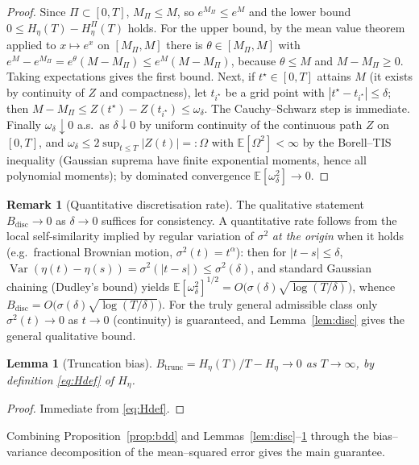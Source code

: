 \documentclass{amsart}
\newtheorem{lemma}{Lemma}
\theoremstyle{definition}
\newtheorem{remark}{Remark}
\DeclareMathOperator{\Var}{Var}
\newcommand{\E}{\mathbb{E}}
\begin{document}
\begin{proof}
Since $\Pi\subset[0,T]$, $M_\Pi\le M$, so $e^{M_\Pi}\le e^M$ and the lower bound
$0\le H_\eta(T)-H_\eta^\Pi(T)$ holds. For the upper bound, by the mean value
theorem applied to $x\mapsto e^x$ on $[M_\Pi,M]$ there is $\theta\in[M_\Pi,M]$
with $e^M-e^{M_\Pi}=e^{\theta}(M-M_\Pi)\le e^M(M-M_\Pi)$, because $\theta\le M$
and $M-M_\Pi\ge0$. Taking expectations gives the first bound. Next, if
$t^\star\in[0,T]$ attains $M$ (it exists by continuity of $Z$ and compactness),
let $t_{i^\star}$ be a grid point with $|t^\star-t_{i^\star}|\le\delta$; then
$M-M_\Pi\le Z(t^\star)-Z(t_{i^\star})\le\omega_\delta$. The Cauchy--Schwarz step
is immediate. Finally $\omega_\delta\downarrow0$ a.s.\ as $\delta\downarrow0$ by
uniform continuity of the continuous path $Z$ on $[0,T]$, and
$\omega_\delta\le 2\sup_{t\le T}|Z(t)|=:\Omega$ with $\E[\Omega^2]<\infty$ by the
Borell--TIS inequality (Gaussian suprema have finite exponential moments, hence
all polynomial moments); by dominated convergence $\E[\omega_\delta^2]\to0$.
\end{proof}

\begin{remark}[Quantitative discretisation rate]\label{rem:rate}
The qualitative statement $B_{\mathrm{disc}}\to0$ as $\delta\to0$ suffices for
consistency. A quantitative rate follows from the local self-similarity implied by
regular variation of $\sigma^2$ \emph{at the origin} when it holds (e.g.\ fractional
Brownian motion, $\sigma^2(t)=t^\alpha$): then for $|t-s|\le\delta$,
$\Var(\eta(t)-\eta(s))=\sigma^2(|t-s|)\le\sigma^2(\delta)$, and standard Gaussian
chaining (Dudley's bound) yields
$\E[\omega_\delta^2]^{1/2}=O\!\big(\sigma(\delta)\sqrt{\log(T/\delta)}\big)$,
whence $B_{\mathrm{disc}}=O\!\big(\sigma(\delta)\sqrt{\log(T/\delta)}\big)$. For
the truly general admissible class only $\sigma^2(t)\to0$ as $t\to0$ (continuity)
is guaranteed, and Lemma~\ref{lem:disc} gives the general qualitative bound.
\end{remark}

\begin{lemma}[Truncation bias]\label{lem:trunc}
$B_{\mathrm{trunc}}=H_\eta(T)/T-H_\eta\to0$ as $T\to\infty$, by definition
\eqref{eq:Hdef} of $H_\eta$.
\end{lemma}

\begin{proof}
Immediate from \eqref{eq:Hdef}.
\end{proof}

Combining Proposition~\ref{prop:bdd} and Lemmas~\ref{lem:disc}--\ref{lem:trunc}
through the bias--variance decomposition of the mean--squared error gives the main
guarantee.
\end{document}

